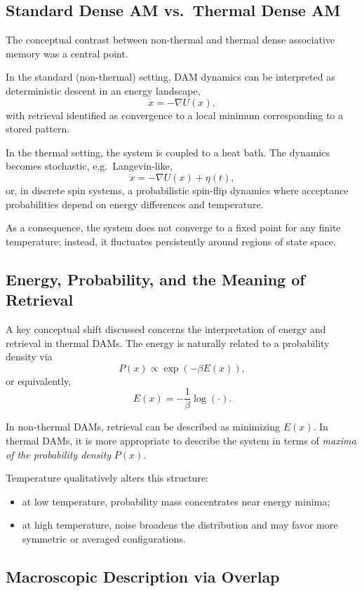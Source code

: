 \documentclass[11pt,a4paper]{article}
\begin{document}
\subsection{Standard Dense AM vs.\ Thermal Dense AM}

The conceptual contrast between non-thermal and thermal dense associative memory was a central point.

In the standard (non-thermal) setting, DAM dynamics can be interpreted as deterministic descent in an energy landscape,
\[
\dot{x} = -\nabla U(x),
\]
with retrieval identified as convergence to a local minimum corresponding to a stored pattern.

In the thermal setting, the system is coupled to a heat bath. The dynamics becomes stochastic, e.g.\ Langevin-like,
\[
\dot{x} = -\nabla U(x) + \eta(t),
\]
or, in discrete spin systems, a probabilistic spin-flip dynamics where acceptance probabilities depend on energy differences and temperature.

As a consequence, the system does not converge to a fixed point for any finite temperature; instead, it fluctuates persistently around regions of state space.

\subsection{Energy, Probability, and the Meaning of Retrieval}

A key conceptual shift discussed concerns the interpretation of energy and retrieval in thermal DAMs. The energy is naturally related to a probability density via
\[
P(x) \propto \exp(-\beta E(x)),
\]
or equivalently,
\[
E(x) = -\frac{1}{\beta}\log(\cdot).
\]

In non-thermal DAMs, retrieval can be described as minimizing \(E(x)\). In thermal DAMs, it is more appropriate to describe the system in terms of \emph{maxima of the probability density} \(P(x)\).

Temperature qualitatively alters this structure:
\begin{itemize}
    \item at low temperature, probability mass concentrates near energy minima;
    \item at high temperature, noise broadens the distribution and may favor more symmetric or averaged configurations.
\end{itemize}

\subsection{Macroscopic Description via Overlap}
\end{document}

